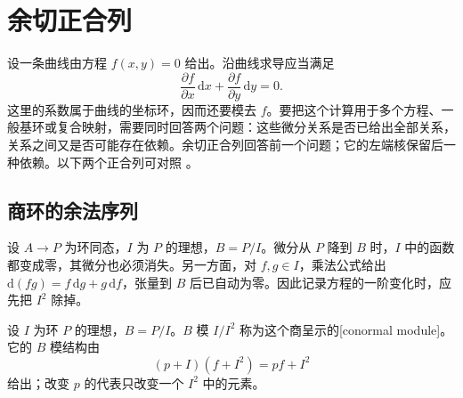 
% 
% 

\section{余切正合列}
\label{g5:sec:0502}

设一条曲线由方程 \(f(x,y)=0\) 给出。沿曲线求导应当满足
\[
	\frac{\partial f}{\partial x}\,\mathrm{d}x+
	\frac{\partial f}{\partial y}\,\mathrm{d}y=0.
\]
这里的系数属于曲线的坐标环，因而还要模去 \(f\)。要把这个计算用于多个方程、一般基环或复合映射，需要同时回答两个问题：这些微分关系是否已给出全部关系，关系之间又是否可能存在依赖。余切正合列回答前一个问题；它的左端核保留后一种依赖。以下两个正合列可对照 \cite[第25节，定理25.1、25.2，第193—195页]{Matsumura1989}。

\subsection{商环的余法序列}
\label{g5:subsec:0502:01}

设 \(A\to P\) 为环同态，\(I\) 为 \(P\) 的理想，\(B=P/I\)。微分从 \(P\) 降到 \(B\) 时，\(I\) 中的函数都变成零，其微分也必须消失。另一方面，对 \(f,g\in I\)，乘法公式给出
\(\mathrm{d}(fg)=f\,\mathrm{d}g+g\,\mathrm{d}f\)，张量到 \(B\) 后已自动为零。因此记录方程的一阶变化时，应先把 \(I^2\) 除掉。

\begin{definition}\label{g5:def:conormal-module}
	设 \(I\) 为环 \(P\) 的理想，\(B=P/I\)。\(B\) 模 \(I/I^2\) 称为这个商呈示的[conormal module]。它的 \(B\) 模结构由
	\[
		(p+I)(f+I^2)=pf+I^2
	\]
	给出；改变 \(p\) 的代表只改变一个 \(I^2\) 中的元素。
\end{definition}

